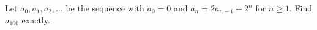 Let $a_0,a_1,a_2,\dots$ be the sequence with $a_0=0$ and $a_n=2a_{n-1}+2^n$ for $n\ge1$. Find $a_{100}$ exactly.
